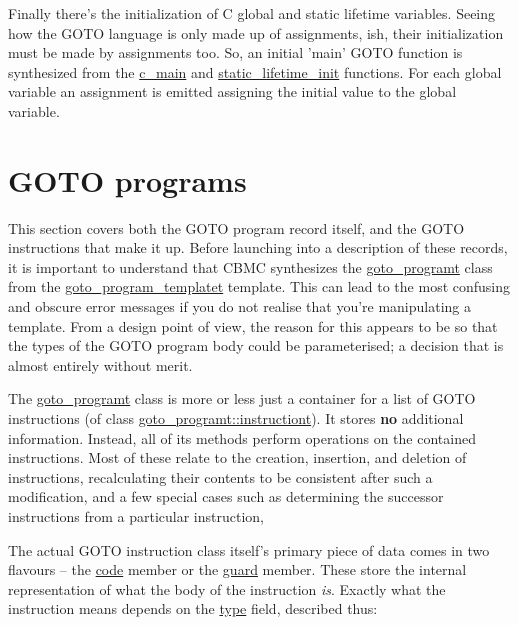 \documentclass{article}
\begin{document}
Finally there's the initialization of C global and static lifetime variables.
Seeing how the GOTO language is only made up of assignments, ish, their
initialization must be made by assignments too. So, an initial 'main' GOTO
function is synthesized from the \url{c_main} and
\url{static_lifetime_init} functions. For each global variable an
assignment is emitted assigning the initial value to the global variable.

\section{GOTO programs}

This section covers both the GOTO program record itself, and the GOTO
instructions that make it up. Before launching into a description of these
records, it is important to understand that CBMC synthesizes the
\url{goto_programt} class from the \url{goto_program_templatet}
template. This can lead to the most confusing and obscure error messages
if you do not realise that you're manipulating a template. From a design
point of view, the reason for this appears to be so that the types of
the GOTO program body could be parameterised; a decision that is almost
entirely without merit.

The \url{goto_programt} class is more or less just a container for a
list of GOTO instructions (of class \url{goto_programt::instructiont}).
It stores \textbf{no} additional information. Instead, all of its methods
perform operations on the contained instructions. Most of these relate
to the creation, insertion, and deletion of instructions, recalculating
their contents to be consistent after such a modification, and a few
special cases such as determining the successor instructions from a
particular instruction,

The actual GOTO instruction class itself's primary piece of data comes in
two flavours -- the \url{code} member or the \url{guard} member.
These store the internal representation of what the body of the instruction
\textit{is}. Exactly what the instruction means depends on the \url{type}
field, described thus:
\end{document}
